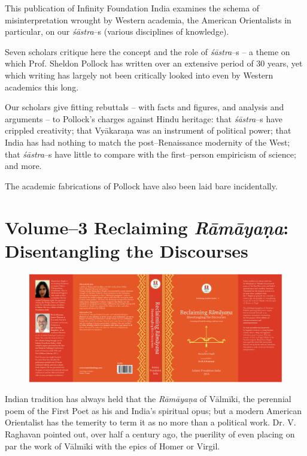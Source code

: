 This publication of Infinity Foundation India examines the schema of misinterpretation wrought by Western academia, the American Orientalists in particular, on our \textit{śāstra}–s (various disciplines of knowledge).

Seven scholars critique here the concept and the role of \textit{śāstra}–s – a theme on which Prof. Sheldon Pollock has written over an extensive period of 30 years, yet which writing has largely not been critically looked into even by Western academics this long.

Our scholars give fitting rebuttals – with facts and figures, and analysis and arguments – to Pollock's charges against Hindu heritage: that \textit{śāstra}–s have crippled creativity; that Vyākaraṇa was an instrument of political power; that India has had nothing to match the post–Renaissance modernity of the West; that \textit{śāstra}–s have little to compare with the first–person empiricism of science; and more.

The academic fabrications of Pollock have also been laid bare incidentally.

\newpage

\section*{Volume–3 Reclaiming \textit{Rāmāyaṇa}: Disentan\-gling the Discourses}

\begin{figure}[!htbp]
\includegraphics[scale=.81]{images/fig03.png}
\end{figure}

Indian tradition has always held that the \textit{Rāmāyaṇa} of Vālmīki, the perennial poem of the First Poet as his and India’s spiritual opus; but a modern American Orientalist has the temerity to term it as no more than a political work. Dr. V. Raghavan pointed out, over half a century ago, the puerility of even placing on par the work of Vālmīki with the epics of Homer or Virgil.

